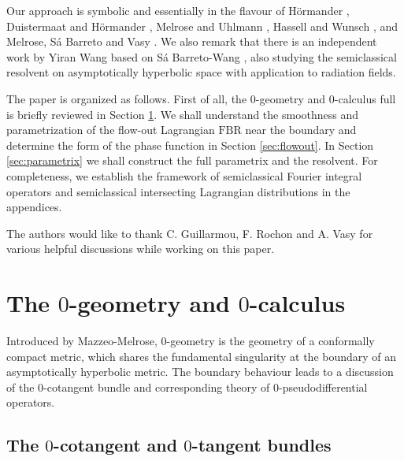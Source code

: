 \documentclass[10pt, a4paper, twoside]{amsart}
\numberwithin{equation}{section}
\theoremstyle{remark}
\begin{document}
Our approach is symbolic and essentially in the flavour of H\"{o}rmander \cite{Hormander-Acta-1971}, Duistermaat and  H\"{o}rmander \cite{Duistermaat-Hormander-Acta-1972}, Melrose and Uhlmann \cite{Melrose-Uhlmann-CPAM-1979}, Hassell and Wunsch \cite{Hassell-Wunsch}, and Melrose, S\'{a} Barreto and Vasy \cite{Melrose-Sa Barreto-Vasy}.
We also remark that  there is an independent work by Yiran Wang \cite{Wang} based on  S\'a Barreto-Wang \cite{SBY}, also studying the semiclassical resolvent on asymptotically hyperbolic space with application to radiation fields. 

The paper is organized as follows. First of all, the $0$-geometry and $0$-calculus full  is briefly reviewed  in Section \ref{sec:calculus}. We shall understand the smoothness and parametrization of the flow-out Lagrangian ${\mathrm{FBR}}$ near the boundary and determine the form of the phase function in Section \ref{sec:flowout}.  In Section \ref{sec:parametrix} we shall construct the full parametrix and the resolvent.  For completeness, we establish the framework of semiclassical Fourier integral operators and semiclassical intersecting Lagrangian distributions in the appendices. 

The authors would like to thank C. Guillarmou, F. Rochon and A. Vasy for various helpful discussions while working on this paper.

\section{The $0$-geometry and $0$-calculus}\label{sec:calculus}

Introduced by Mazzeo-Melrose, $0$-geometry is the geometry of a conformally compact metric, which shares the fundamental singularity at the boundary of an asymptotically hyperbolic metric. The boundary behaviour leads to a discussion of the $0$-cotangent bundle and corresponding theory of $0$-pseudodifferential operators.

\subsection{The $0$-cotangent and $0$-tangent bundles}\label{subsec:0bundle}
\end{document}
